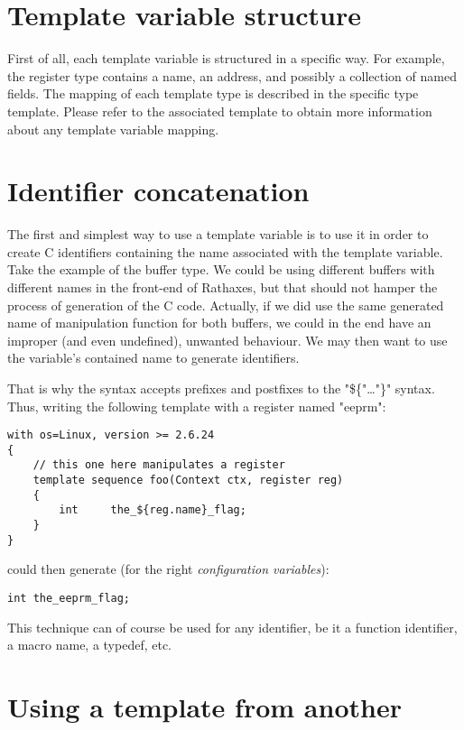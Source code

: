 \documentclass[american]{rtxreport}
\begin{document}
\section{Template variable structure}

First of all, each template variable is structured in a specific way. For
example, the register type contains a name, an address, and possibly a
collection of named fields. The mapping of each template type is described in
the specific type template. Please refer to the associated template to obtain
more information about any template variable mapping.

\section{Identifier concatenation}

The first and simplest way to use a template variable is to use it in order to
create C identifiers containing the name associated with the template variable.
Take the example of the buffer type. We could be using different buffers with
different names in the front-end of Rathaxes, but that should not hamper the
process of generation of the C code. Actually, if we did use the same generated
name of manipulation function for both buffers, we could in the end have an
improper (and even undefined), unwanted behaviour. We may then want to use the
variable's contained name to generate identifiers.

That is why the syntax accepts prefixes and postfixes to the "\$\{"\ldots"\}"
syntax. Thus, writing the following template with a register named "eeprm":
\begin{lstlisting}
with os=Linux, version >= 2.6.24
{
    // this one here manipulates a register
    template sequence foo(Context ctx, register reg)
    {
        int     the_${reg.name}_flag;
    }
}
\end{lstlisting}

could then generate (for the right \emph{configuration variables}):
\lstset{language=C}
\begin{lstlisting}
int the_eeprm_flag;
\end{lstlisting}

This technique can of course be used for any identifier, be it a function
identifier, a macro name, a typedef, etc.

\section{Using a template from another}
\end{document}
